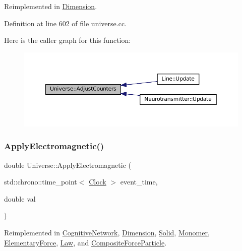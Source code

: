 Reimplemented in \mbox{\hyperlink{class_dimension_a31e28c2777888449fad32843f6dd15ed}{Dimension}}.



Definition at line 602 of file universe.\+cc.

Here is the caller graph for this function\+:\nopagebreak
\begin{figure}[H]
\begin{center}
\leavevmode
\includegraphics[width=350pt]{class_universe_a15aa20218286fd11ecb9b792dfb63be3_icgraph}
\end{center}
\end{figure}
\mbox{\label{class_universe_a1f787da78fa196ba635db21a9e91dabb}} 
\subsubsection{\texorpdfstring{Apply\+Electromagnetic()}{ApplyElectromagnetic()}}
{\footnotesize\ttfamily double Universe\+::\+Apply\+Electromagnetic (\begin{DoxyParamCaption}\item[{std\+::chrono\+::time\+\_\+point$<$ \mbox{\hyperlink{universe_8h_a0ef8d951d1ca5ab3cfaf7ab4c7a6fd80}{Clock}} $>$}]{event\+\_\+time,  }\item[{double}]{val }\end{DoxyParamCaption})\hspace{0.3cm}{\ttfamily [virtual]}}



Reimplemented in \mbox{\hyperlink{class_cognitive_network_ae590ecb77db0a876425b9b74bcfe2bce}{Cognitive\+Network}}, \mbox{\hyperlink{class_dimension_a65bcd3c09792cf53b1f614eff49cf111}{Dimension}}, \mbox{\hyperlink{class_solid_ab546d607d6f0bf70dc5e6bbac8baf287}{Solid}}, \mbox{\hyperlink{class_monomer_ae64dfbf82610ae26427be9c824aef70f}{Monomer}}, \mbox{\hyperlink{class_elementary_force_a0045a3380e468c6cfdbefce829888c1f}{Elementary\+Force}}, \mbox{\hyperlink{class_law_a418791aee2a9204a99d3a917b86fafd3}{Law}}, and \mbox{\hyperlink{class_composite_force_particle_afa4dc18258722b3c85fbc9789a4297a5}{Composite\+Force\+Particle}}.




